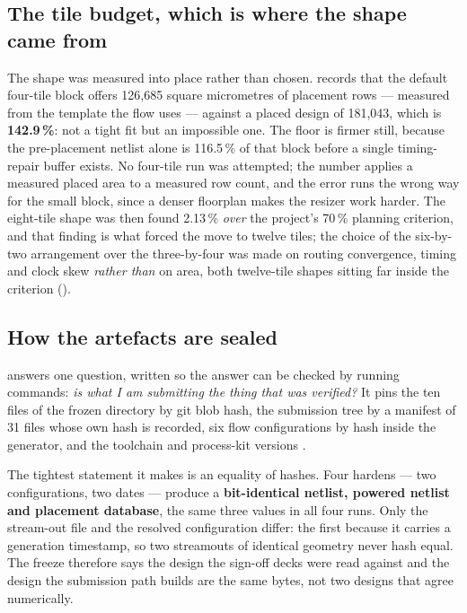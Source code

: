 \subsection{The tile budget, which is where the shape came from}

The shape was measured into place rather than chosen. 
records that the default four-tile block offers 126,685 square
micrometres of placement rows --- measured from the template the flow
uses --- against a placed design of 181,043, which is
\textbf{142.9\,\%}: not a tight fit but an impossible one. The floor is
firmer still, because the pre-placement netlist alone is 116.5\,\% of
that block before a single timing-repair buffer exists. No four-tile
run was attempted; the number applies a measured placed area to a
measured row count, and the error runs the wrong way for the small
block, since a denser floorplan makes the resizer work harder. The
eight-tile shape was then found 2.13\,\% \emph{over} the project's
70\,\% planning criterion, and that finding is what forced the move to
twelve tiles; the choice of the six-by-two arrangement over the
three-by-four was made on routing convergence, timing and clock skew
\emph{rather than} on area, both twelve-tile shapes sitting far inside
the criterion ().

\subsection{How the artefacts are sealed}

 answers one question, written so the answer can be checked
by running commands: \emph{is what I am submitting the thing that was
verified?} It pins the ten files of the frozen directory by git blob
hash, the submission tree by a manifest of 31 files whose own hash is
recorded, six flow configurations by hash inside the generator, and the
toolchain and process-kit versions \cite{lamb2022}.

The tightest statement it makes is an equality of hashes. Four hardens
--- two configurations, two dates --- produce a \textbf{bit-identical
netlist, powered netlist and placement database}, the same three values
in all four runs. Only the stream-out file and the resolved
configuration differ: the first because it carries a generation
timestamp, so two streamouts of identical geometry never hash equal.
The freeze therefore says the design the sign-off decks were read
against and the design the submission path builds are the same bytes,
not two designs that agree numerically.

